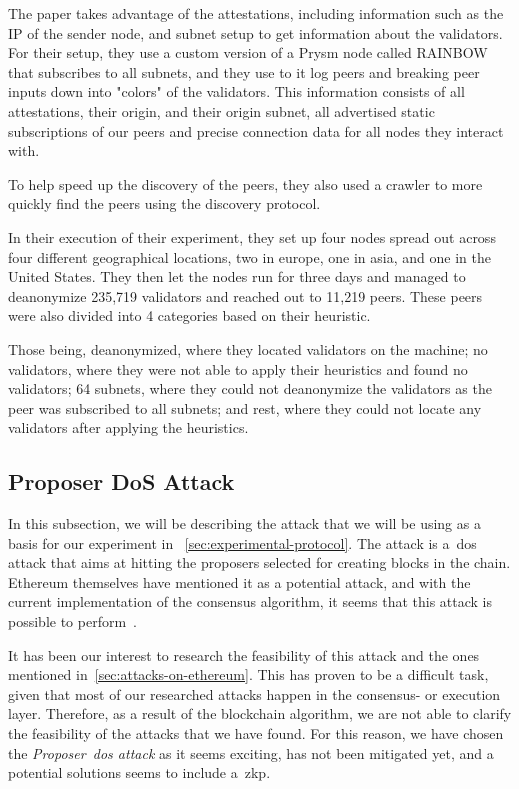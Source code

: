 The paper takes advantage of the attestations, including information such as the IP of the sender node, and subnet setup to get information about the validators.
For their setup, they use a custom version of a Prysm node called RAINBOW that subscribes to all subnets, and they use to it log peers and breaking peer inputs down into "colors" of the validators.
This information consists of all attestations, their origin, and their origin subnet, all advertised static subscriptions of our peers and precise connection data for all nodes they interact with.

To help speed up the discovery of the peers, they also used a crawler to more quickly find the peers using the discovery protocol.

In their execution of their experiment, they set up four nodes spread out across four different geographical locations, two in europe, one in asia, and one in the United States.
They then let the nodes run for three days and managed to deanonymize 235,719 validators and reached out to 11,219 peers.
These peers were also divided into 4 categories based on their heuristic.

Those being, deanonymized, where they located validators on the machine; no validators, where they were not able to apply their heuristics and found no validators; 64 subnets, where they could not deanonymize the validators as the peer was subscribed to all subnets; and rest, where they could not locate any validators after applying the heuristics.

\subsection{Proposer DoS Attack}\label{subsec:proposer-dos-attack}
In this subsection, we will be describing the attack that we will be using as a basis for our experiment in ~\autoref{sec:experimental-protocol}.
The attack is a~\gls{dos} attack that aims at hitting the proposers selected for creating blocks in the chain.
Ethereum themselves have mentioned it as a potential attack, and with the current implementation of the consensus algorithm, it seems that this attack is possible to perform~\cite{EthereumSSLE2024,EthereumAttackDefense2024}.

It has been our interest to research the feasibility of this attack and the ones mentioned in~\autoref{sec:attacks-on-ethereum}.
This has proven to be a difficult task, given that most of our researched attacks happen in the consensus- or execution layer.
Therefore, as a result of the blockchain algorithm, we are not able to clarify the feasibility of the attacks that we have found.
For this reason, we have chosen the \textit{Proposer~\gls{dos} attack} as it seems exciting, has not been mitigated yet, and a potential solutions seems to include a~\gls{zkp}.

